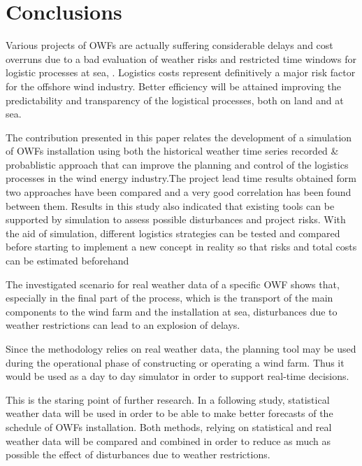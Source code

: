 \section{Conclusions}
Various projects of OWFs are actually suffering considerable delays and cost overruns due to a bad evaluation of weather risks and restricted time windows for logistic processes at sea, \cite{TCE12, ISOPE2013}. Logistics costs represent definitively a major risk factor for the offshore wind industry. Better efficiency will be attained improving the predictability and transparency of the logistical processes, both on land and at sea.

The contribution presented in this paper relates the development of a simulation of OWFs installation using both the historical weather time series recorded & probablistic approach that can improve the planning and control of the logistics processes in the wind energy industry.The project lead time results obtained form two approaches have been compared and a very good correlation has been found between them. Results in this study also  indicated that existing tools can be supported by simulation to assess possible disturbances and project risks. With the aid of simulation, different logistics strategies can be tested and compared before starting to implement a new concept in reality so that risks and total costs can be estimated beforehand

The investigated scenario for real weather data of a specific OWF shows that, especially in the final part of the process, which is the transport of the main components to the wind farm and the installation at sea, disturbances due to weather restrictions can lead to an explosion of delays. 

Since the methodology relies on real weather data, the planning tool may be used during the operational phase of constructing or operating a wind farm. Thus it would be used as a day to day simulator in order to support real-time decisions.

This is the staring point of further research. In a following study, statistical weather data will be used in order to be able to make better forecasts of the schedule of OWFs installation. Both methods, relying on statistical and real weather data will be compared and combined in order to reduce as much as possible the effect of disturbances due to weather restrictions.